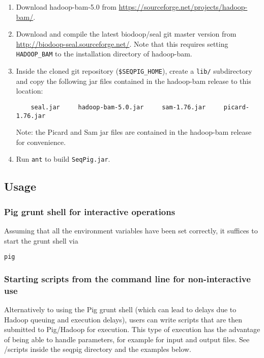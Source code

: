 \begin{enumerate}
\item Download hadoop-bam-5.0 from \url{https://sourceforge.net/projects/hadoop-bam/}.

\item Download and compile the latest biodoop/seal git master version from
 \url{http://biodoop-seal.sourceforge.net/}. Note that this requires
 setting {\tt HADOOP\_BAM} to the installation directory of hadoop-bam.

\item Inside the cloned git repository ({\tt \$SEQPIG\_HOME}), create a
{\tt lib/} subdirectory and copy the following jar files contained in the
hadoop-bam release to this location:
%
\begin{lstlisting} 
    seal.jar     hadoop-bam-5.0.jar     sam-1.76.jar     picard-1.76.jar
\end{lstlisting}
%
Note: the Picard and Sam jar files are contained in the hadoop-bam release
for convenience.

\item Run {\tt ant} to build {\tt SeqPig.jar}.
\end{enumerate}

\subsection{Usage}

\subsubsection{Pig grunt shell for interactive operations}
Assuming that all the environment variables have been set correctly, it suffices
to start the grunt shell via
%
\begin{lstlisting}
pig
\end{lstlisting}
%
\subsubsection{Starting scripts from the command line for non-interactive use}
Alternatively to using the Pig grunt shell (which can lead to delays due to
Hadoop queuing and execution delays), users can write scripts that are
then submitted to Pig/Hadoop for execution. This type of execution has
the advantage of being able to handle parameters, for example for input
and output files. See /scripts inside the seqpig directory and the
examples below.
